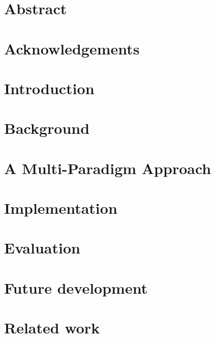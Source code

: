 \documentclass{article}
\begin{document}

\clearpage

\section*{Abstract}
\clearpage

\section*{Acknowledgements}
\clearpage

\tableofcontents
\clearpage

\section{Introduction}
\label{sec:intro}


\section{Background}
\label{sec:background}


\section{A Multi-Paradigm Approach}
\label{sec:design}


\section{Implementation}
\label{sec:implementation}


\section{Evaluation}



\section{Future development}

\section{Related work}
\label{sec:related}

\end{document}
